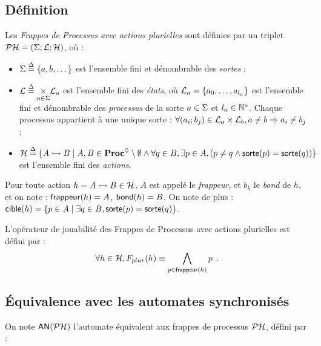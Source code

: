 \subsection{Définition}


\begin{definition}
  Les \emph{Frappes de Processus avec actions plurielles} sont définies
  par un triplet $\mathcal{PH} = (\Sigma; \mathcal{L}; \mathcal{H})$, où :
  \begin{itemize}
    \item $\Sigma \stackrel{\Delta}= \{a, b, \dots\}$ est l'ensemble fini et dénombrable des \emph{sortes} ;
    \item $\mathcal{L} \stackrel{\Delta}= \underset{a \in \Sigma}{\times} \mathcal{L}_a$ est l'ensemble fini des \emph{états},
      où $\mathcal{L}_a = \{a_0, \ldots, a_{l_a}\}$ est l'ensemble fini et dénombrable
      des \emph{processus} de la sorte $a \in \Sigma$ et $l_a \in \mathbb{N}^*$.
      Chaque processus appartient à une unique sorte :
      $\forall (a_i; b_j) \in \mathcal{L}_a \times \mathcal{L}_b, a \neq b \Rightarrow a_i \neq b_j$ ;
    \item $\mathcal{H} \stackrel{\Delta}= \{\mbox{$A \rightarrowtail B$} \mid A, B \in \mathbf{Proc}^{\lozenge} \setminus \emptyset \wedge
      \forall q \in B, \exists p \in A, (p \neq q \wedge \mathsf{sorte}(p) = \mathsf{sorte}(q)) \}$
      est l'ensemble fini des \emph{actions}.
  \end{itemize}
\end{definition}
%
\noindent
Pour toute action $h = \mbox{$A \rightarrowtail B$} \in \mathcal{H}$,
$A$ est appelé le \emph{frappeur}, et $b_k$ le \emph{bond} de $h$,
et on note : $\mathsf{frappeur}(h) = A$, $\mathsf{bond}(h) = B$.
On note de plus :
$\mathsf{cible}(h) = \{ p \in A \mid \exists q \in B, \mathsf{sorte}(p) = \mathsf{sorte}(q) \}$.

\begin{definition}
  L'opérateur de jouabilité des Frappes de Processus avec actions plurielles est défini par :
  \[\forall h \in \mathcal{H}, F_{plur}(h) \equiv \bigwedge_{p \in \mathsf{frappeur}(h)} p \enspace.\]
\end{definition}



\subsection{Équivalence avec les automates synchronisés}

On note $\mathsf{AN}(\mathcal{PH})$ l'automate équivalent aux frappes de processus $\mathcal{PH}$, défini par :

